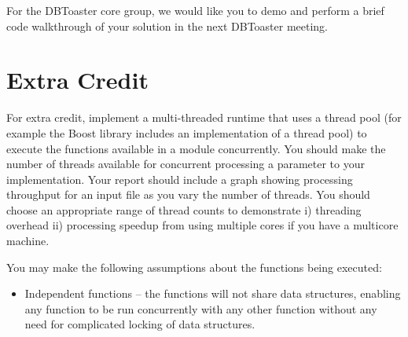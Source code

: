 \documentclass{article}
\newcommand{\comment}[1]{}
\begin{document}
\noindent For the DBToaster core group\comment{, rather than mailing us your files}, we would like you to demo and perform a brief code walkthrough of your solution in the next DBToaster meeting.

\section{Extra Credit}
For extra credit, implement a multi-threaded runtime that uses a thread pool (for example the Boost library includes an implementation of a thread pool) to execute the functions available in a module concurrently. You should make the number of threads available for concurrent processing a parameter to your implementation. Your report should include a graph showing processing throughput for an input file as you vary the number of threads. You should choose an appropriate range of thread counts to demonstrate i) threading overhead ii) processing speedup from using multiple cores if you have a multicore machine.

\vspace{2mm}
\noindent You may make the following assumptions about the functions being executed:

\begin{itemize}
\item Independent functions -- the functions will not share data structures, enabling any function to be run concurrently with any other function without any need for complicated locking of data structures.
\end{itemize}
\end{document}

